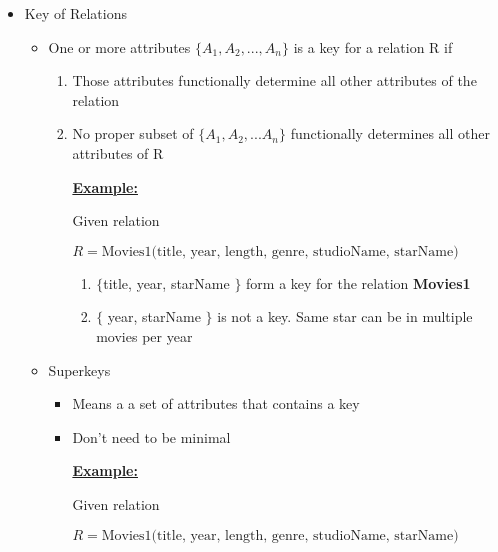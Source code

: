\documentclass[12pt]{article}
\begin{document}
\begin{enumerate}[1.]
\begin{itemize}
\begin{itemize}
        \end{itemize}

        \item Key of Relations
        \begin{itemize}
            \item One or more attributes $\{A_1,A_2,...,A_n\}$ is a key for a relation R if
            \begin{enumerate}[1.]
                \item Those attributes functionally determine all other attributes of the relation
                \item No proper subset of $\{A_1,A_2,...A_n\}$ functionally determines all other attributes of R


                \bigskip

                \underline{\textbf{Example:}}

                \bigskip

                Given relation

                \bigskip

                $R = \text{Movies1(title, year, length, genre, studioName, starName)}$

                \begin{enumerate}
                    \item $\{$title, year, starName $\}$ form a key for the relation \textbf{Movies1}
                    \item $\{$ year, starName $\}$ is not a key. Same star can be in multiple
                    movies per year
                \end{enumerate}
            \end{enumerate}

            \item Superkeys
            \begin{itemize}
                \item Means a a set of attributes that contains a key
                \item Don't need to be minimal

                \bigskip

                \underline{\textbf{Example:}}

                Given relation

                \bigskip

                $R = \text{Movies1(title, year, length, genre, studioName, starName)}$


\end{itemize}
\end{itemize}
\end{itemize}
\end{enumerate}
\end{document}
